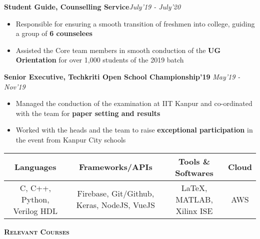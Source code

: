 \documentclass[9pt]{article}
\newenvironment{changemargin}[2]{%
  \begin{list}{}{%
    \setlength{\topsep}{2pt}%
    \setlength{\leftmargin}{#1}%
    \setlength{\rightmargin}{#2}%
    \setlength{\listparindent}{\parindent}%
    \setlength{\itemindent}{\parindent}%
    \setlength{\parsep}{\parskip}%
  }%
  \item[]}{\end{list}
}
\newcommand{\lineover}{
	\begin{changemargin}{0in}{0in}
		\vspace*{-18pt}
		\hrulefill \\
		\vspace*{-8pt}
	\end{changemargin}
}
\newcommand{\header}[1]{
	\begin{changemargin}{-0.5in}{-0.5in}
	\vspace{-4pt}
		\Large\bfseries\scshape{#1}\hrulefill
  	\lineover
	\end{changemargin}
}
\newenvironment{body} {
	\vspace*{-16pt}
	\begin{changemargin}{-0.4in}{-0.5in}
  }	
	{\end{changemargin}
}
\begin{document}
\begin{body}
	\vspace{16pt}
	\textbf {Student Guide, Counselling Service}\hfill {\em July'19 - July'20}
	\vspace{-4pt}
	\begin{itemize} \itemsep -1pt
		\item Responsible for ensuring a smooth transition of freshmen into college, guiding a group of \textbf{6 counselees}
		\item Assisted the Core team members in smooth conduction of the \textbf{UG Orientation} for over 1,000 students of the 2019 batch
	\end{itemize}
	\vspace{-3pt}
		\textbf {Senior Executive, Techkriti Open School Championship'19} \hfill {\em May'19 - Nov'19}\\
\vspace{-5pt}
	\begin{itemize} \itemsep -1pt
		\item Managed the conduction of the examination at IIT Kanpur and co-ordinated with the team for \textbf{paper setting and results}
		\item Worked with the heads and the team to raise \textbf{exceptional participation} in the event from Kanpur City schools
  
	\end{itemize}
	

  
	
	\end{body}


\vspace{-8pt}

\begin{body}
    \vspace{21pt}
    \renewcommand{\arraystretch}{1.1}
    \setlength{\tabcolsep}{13.4pt}
    \begin{tabular}{|c|c|c|c|}
        \hline
        \textbf{Languages} & \textbf{Frameworks/APIs} & \textbf{Tools \& Softwares} & \textbf{Cloud}\\
        \hline
        C, C{++}, Python, Verilog HDL & Firebase, Git/Github, Keras, NodeJS, VueJS & \LaTeX, MATLAB, Xilinx ISE & AWS\\
        \hline
    \end{tabular}
\end{body}
\vspace{-0pt}
\header{Relevant Courses}
\end{document}
